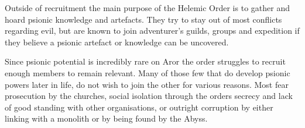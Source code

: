 Outside of recruitment the main purpose of the Helemic Order is to gather and
hoard psionic knowledge and artefacts. They try to stay out of most conflicts
regarding evil, but are known to join adventurer's guilds, groups and
expedition if they believe a psionic artefact or knowledge can be uncovered.

Since psionic potential is incredibly rare on Aror the order struggles to
recruit enough members to remain relevant. Many of those few that do develop
psionic powers later in life, do not wish to join the other for various
reasons. Most fear prosecution by the churches, social isolation through the
orders secrecy and lack of good standing with other organisations, or outright
corruption by either linking with a monolith or by being found by the Abyss.
